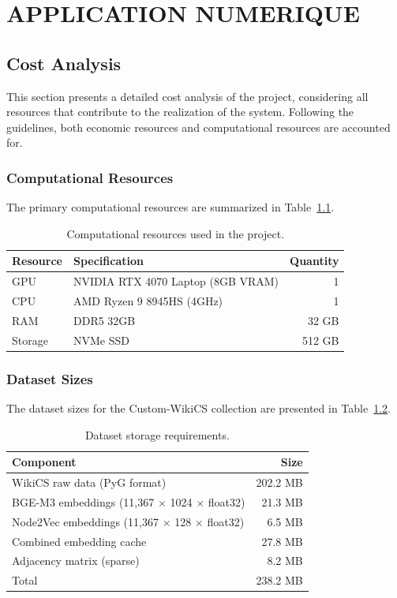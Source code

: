\chapter{APPLICATION NUMERIQUE}
\thispagestyle{empty}

\section{Cost Analysis}

This section presents a detailed cost analysis of the project, considering all resources that contribute to the realization of the system. Following the guidelines, both economic resources and computational resources are accounted for.

\subsection{Computational Resources}

The primary computational resources are summarized in Table~\ref{tab:compute-resources}.

\begin{table}[htbp]
\centering
\caption{Computational resources used in the project.}
\label{tab:compute-resources}
\begin{tabular}{llr}
\toprule
\textbf{Resource} & \textbf{Specification} & \textbf{Quantity} \\
\midrule
GPU & NVIDIA RTX 4070 Laptop (8GB VRAM) & 1 \\
CPU & AMD Ryzen 9 8945HS (4GHz) & 1 \\
RAM & DDR5 32GB & 32 GB \\
Storage & NVMe SSD & 512 GB \\
\bottomrule
\end{tabular}
\end{table}

\subsection{Dataset Sizes}

The dataset sizes for the Custom-WikiCS collection are presented in Table~\ref{tab:dataset-sizes}.

\begin{table}[htbp]
\centering
\caption{Dataset storage requirements.}
\label{tab:dataset-sizes}
\begin{tabular}{lr}
\toprule
\textbf{Component} & \textbf{Size} \\
\midrule
WikiCS raw data (PyG format) & 202.2 MB \\
BGE-M3 embeddings (11,367 $\times$ 1024 $\times$ float32) & 21.3 MB \\
Node2Vec embeddings (11,367 $\times$ 128 $\times$ float32) & 6.5 MB \\
Combined embedding cache & 27.8 MB \\
Adjacency matrix (sparse) & 8.2 MB \\
Total & \multicolumn{1}{r}{238.2 MB} \\
\bottomrule
\end{tabular}
\end{table}


